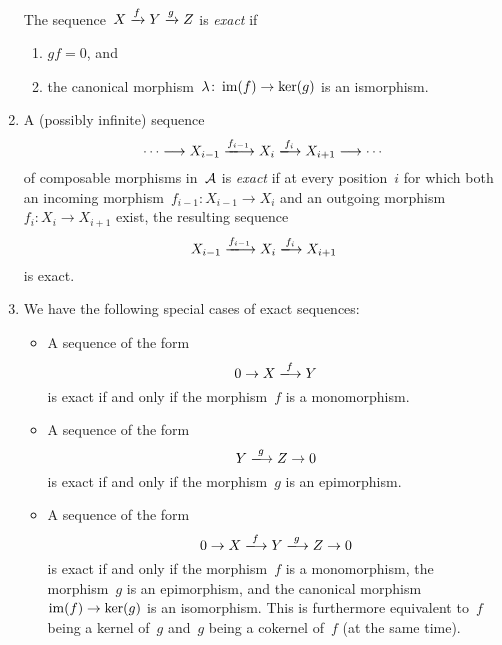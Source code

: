 \begin{remarkdefinition}
\begin{enumerate}
      The sequence~$X \xrightarrow{f} Y \xrightarrow{g} Z$ is \emph{exact} if
      \begin{enumerate}[label=(E\arabic*)]
        \item
          $gf = 0$, and
        \item
          the canonical morphism~$\lambda \colon \operatorname{im}(f) \to \ker(g)$ is an ismorphism.
      \end{enumerate}
    \item
      A (possibly infinite) sequence
      \[
          \dotsb
        \longto
          X_{i-1}
        \xlongto{f_{i-1}}
          X_i
        \xlongto{f_i}
          X_{i+1}
        \longto
          \dotsb
      \]
      of composable morphisms in~$\mathcal{A}$ is \emph{exact} if at every position~$i$ for which both an incoming morphism~$f_{i-1} \colon X_{i-1} \to X_i$ and an outgoing morphism~$f_i \colon X_i \to X_{i+1}$ exist, the resulting sequence
      \[
          X_{i-1}
        \xlongto{f_{i-1}}
          X_i
        \xlongto{f_i}
          X_{i+1}
      \]
      is exact.
    \item
      We have the following special cases of exact sequences:
      \begin{itemize}
        \item
          A sequence of the form
          \[
            0
            \to
            X
            \xlongto{f}
            Y
          \]
          is exact if and only if the morphism~$f$ is a monomorphism.
        \item
          A sequence of the form
          \[
            Y
            \xlongto{g}
            Z
            \to
            0
          \]
          is exact if and only if the morphism~$g$ is an epimorphism.
        \item
          A sequence of the form
          \[
            0
              \to
            X
              \xlongto{f}
            Y
              \xlongto{g}
            Z
              \to
            0
          \]
          is exact if and only if the morphism~$f$ is a monomorphism, the morphism~$g$ is an epimorphism, and the canonical morphism~$\operatorname{im}(f) \to \ker(g)$ is an isomorphism.
          This is furthermore equivalent to~$f$ being a kernel of~$g$ and~$g$ being a cokernel of~$f$ (at the same time).
      \end{itemize}
  \end{enumerate}
\end{remarkdefinition}


